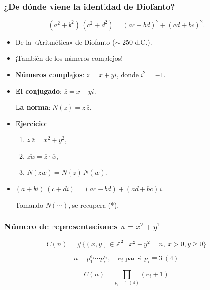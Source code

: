 \documentclass[handout]{beamer}
\newcommand{\ZZ}{\mathbb{Z}}
\begin{document}
\begin{frame}[fragile]
  \frametitle{¿De dónde viene la identidad de Diofanto?}

  \[ \tag{*} (a^2 + b^2)\,(c^2 + d^2) = (ac - bd)^2 + (ad + bc)^2. \]

  \begin{itemize}
  \item<2-> De la «Aritmética» de Diofanto ($\sim$ 250 d.C.).

  \item<3-> ¡También de los números complejos!

  \item<4-> \textbf{Números complejos}: $z = x + yi$, donde $i^2 = -1$.

  \item<5-> \textbf{El conjugado}: $\overline{z} = x - yi$.

    \textbf{La norma}: $N (z) = z\,\overline{z}$.

  \item<6-> \textbf{Ejercicio}:

    \begin{enumerate}
    \item $z\,\overline{z} = x^2 + y^2$,
    \item $\overline{zw} = \overline{z}\cdot \overline{w}$,
    \item $N (zw) = N(z)\,N(w)$.
    \end{enumerate}

  \item<7-> $(a + bi)\,(c + di) = (ac - bd) + (ad + bc)\,i$.

    Tomando $N (\cdots)$, se recupera (*).
  \end{itemize}
\end{frame}


\begin{frame}[fragile]
  \frametitle{Número de representaciones $n = x^2 + y^2$}

  \begin{shaded}
    \[ C(n) = \# \{ (x,y) \in \ZZ^2 \mid x^2 + y^2 = n, ~ x > 0, y \ge 0 \} \]

    \[ n = p_1^{e_1} \cdots p_s^{e_s}, \quad e_i \text{ par si }p_i \equiv 3~(4) \]

    \[ C(n) = \prod_{p_i \equiv 1 ~ (4)} (e_i + 1) \]
  \end{shaded}

\end{frame}
\end{document}
